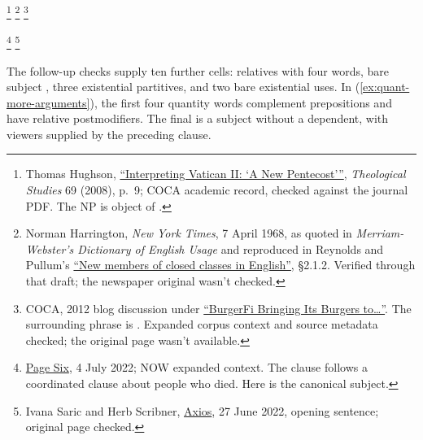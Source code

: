 \documentclass[12pt]{article}
\begin{document}
\ea\label{ex:quant-arguments}
\ea\label{ex:countless-part} \footnote{Thomas Hughson, \href{https://theologicalstudies.net/wp-content/uploads/2022/08/69.1.1.pdf\#page=7}{\enquote{Interpreting Vatican II: ‘A New Pentecost’}}, \textit{Theological Studies} 69 (2008), p.~9; COCA academic record, checked against the journal PDF. The NP is object of .}
\ex\label{ex:numerous-part} \footnote{Norman Harrington, \textit{New York Times}, 7 April 1968, as quoted in \textit{Merriam-Webster's Dictionary of English Usage} and reproduced in Reynolds and Pullum's \href{https://www.lel.ed.ac.uk/~gpullum/ClosedClasses.pdf}{\enquote{New members of closed classes in English}}, §2.1.2. Verified through that draft; the newspaper original wasn't checked.}
\ex\label{ex:multiple-part} \footnote{COCA, 2012 blog discussion under \href{http://www.tonetoatl.com/2012/08/burgerfi-bringing-its-burgers-to.html}{\enquote{BurgerFi Bringing Its Burgers to\ldots}}. The surrounding phrase is . Expanded corpus context and source metadata checked; the original page wasn't available.}
\begin{samepage}
\ex\label{ex:numerous-subj} \footnote{\href{https://pagesix.com/2022/07/04/travis-scott-performs-in-miami-at-e11even/}{Page Six}, 4 July 2022; NOW expanded context. The clause follows a coordinated clause about people who died. Here  is the canonical subject.}
\ex\label{ex:multiple-subj} \footnote{Ivana Saric and Herb Scribner, \href{https://www.axios.com/2022/06/27/amtrak-train-derail-missouri}{Axios}, 27 June 2022, opening sentence; original page checked.}
\end{samepage}
\z\z

The follow-up checks supply ten further cells: relatives with four words, bare subject , three existential partitives, and two bare existential uses. In (\ref{ex:quant-more-arguments}), the first four quantity words complement prepositions and have relative postmodifiers. The final  is a subject without a dependent, with viewers supplied by the preceding clause.
\end{document}
